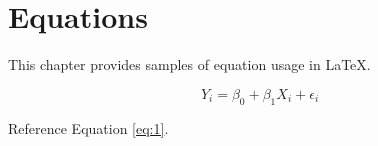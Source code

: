

\chapter{Equations} \label{equations}

This chapter provides samples of equation usage in LaTeX.

\begin{equation}
\label{eq:1}
	Y_i = \beta_0 + \beta_1 X_i + \epsilon_i
\end{equation}

Reference Equation \ref{eq:1}.
